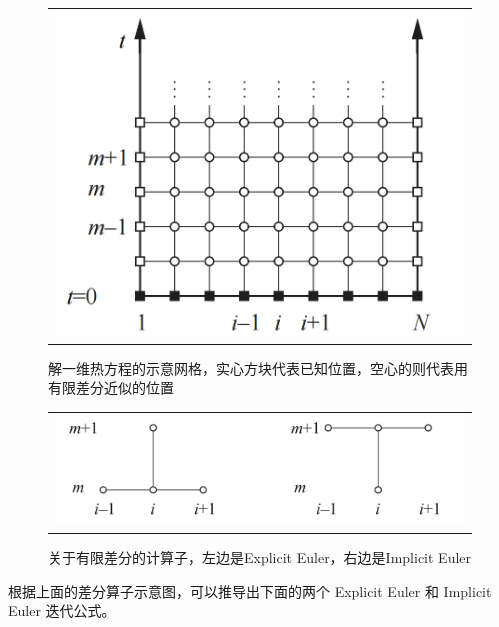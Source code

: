 \documentclass[3p]{elsarticle}
\numberwithin{equation}{section}
\begin{document}
    \begin{figure}[h]
	\begin{center}
		\begin{tabular}{c}
			\includegraphics[angle=0, scale=0.25]{./figures/mesh.png}
		\end{tabular}
	\end{center}
	\caption{解一维热方程的示意网格，实心方块代表已知位置，空心的则代表用有限差分近似的位置}
	\label{fig:illustration-mesh}
    \end{figure}
    
    
    \begin{figure}[h]
    	\begin{center}
    		\begin{tabular}{c}
    			\includegraphics[angle=0, scale=0.25]{./figures/compute_molecules.png}
    		\end{tabular}
    	\end{center}
    	\caption{关于有限差分的计算子，左边是Explicit Euler，右边是Implicit Euler}
    	\label{fig:illustration-molecules}
    \end{figure}

    根据上面的差分算子示意图，可以推导出下面的两个 Explicit Euler 和 Implicit Euler 迭代公式。
        
\end{document}
